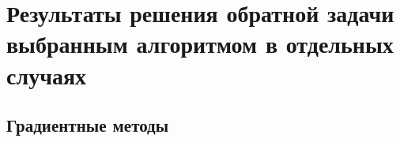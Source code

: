 \chapter{Результаты решения обратной задачи выбранным алгоритмом в отдельных случаях}\label{ch:ch_my_6}

\section{Градиентные методы}\label{sec:ch_my_6/sec1}




